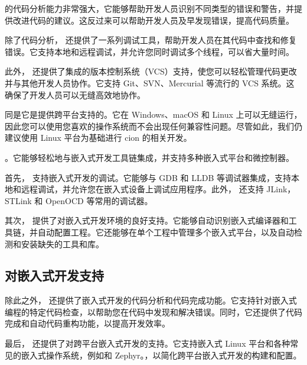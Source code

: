 \documentclass[a4paper,12pt,english]{sphinxmanual}
\begin{document}
\sphinxAtStartPar
{} 的代码分析能力非常强大，它能够帮助开发人员识别不同类型的错误和警告，并提供改进代码的建议。这反过来可以帮助开发人员及早发现错误，提高代码质量。

\sphinxAtStartPar
除了代码分析， 还提供了一系列调试工具，帮助开发人员在其代码中查找和修复错误。它支持本地和远程调试，并允许您同时调试多个线程，可以省大量时间。

\sphinxAtStartPar
此外， 还提供了集成的版本控制系统（VCS）支持，使您可以轻松管理代码更改并与其他开发人员协作。它支持 Git、SVN、Mercurial 等流行的 VCS 系统。这确保了开发人员可以无缝高效地协作。

\sphinxAtStartPar
同是它是提供跨平台支持的。它在 Windows、macOS 和 Linux 上可以无缝运行，因此您可以使用您喜欢的操作系统而不会出现任何兼容性问题。尽管如此，我们仍建议使用 Linux 平台为基础进行 cion 的相关开发。

\sphinxAtStartPar
{}。它能够轻松地与嵌入式开发工具链集成，并支持多种嵌入式平台和微控制器。

\sphinxAtStartPar
首先， 支持嵌入式开发的调试。它能够与 GDB 和 LLDB 等调试器集成，支持本地和远程调试，并允许您在嵌入式设备上调试应用程序。此外， 还支持 J\sphinxhyphen{}Link，ST\sphinxhyphen{}Link 和 OpenOCD 等常用的调试器。

\sphinxAtStartPar
其次， 提供了对嵌入式开发环境的良好支持。它能够自动识别嵌入式编译器和工具链，并自动配置工程。它还能够在单个工程中管理多个嵌入式平台，以及自动检测和安装缺失的工具和库。


\subsection{ 对嵌入式开发支持}
\label{\detokenize{dev-board/clion:id2}}
\sphinxAtStartPar
除此之外， 还提供了嵌入式开发的代码分析和代码完成功能。它支持针对嵌入式编程的特定代码检查，以帮助您在代码中发现和解决错误。同时，它还提供了代码完成和自动代码重构功能，以提高开发效率。

\sphinxAtStartPar
最后， 还提供了对跨平台嵌入式开发的支持。它支持嵌入式 Linux 平台和各种常见的嵌入式操作系统，例如和 Zephyr。，以简化跨平台嵌入式开发的构建和配置。
\end{document}
